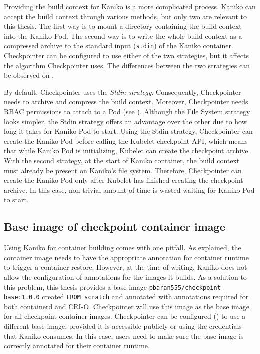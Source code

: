 \documentclass[
  digital,     %
  oneside,     %
  nosansbold,  %
  nocolorbold, %
  lof,         %
  nolot,         %
]{fithesis4}
\begin{document}
Providing the build context for Kaniko is a more complicated process. Kaniko can accept the build context through various methods, but only two are relevant to this thesis. The first way is to mount a directory containing the build context into the Kaniko Pod. The second way is to write the whole build context as a compressed archive to the standard input (\texttt{stdin}) of the Kaniko container. Checkpointer can be configured to use either of the two strategies, but it affects the algorithm Checkpointer uses. The differences between the two strategies can be observed on .


By default, Checkpointer uses the \emph{Stdin strategy}. Consequently, Checkpointer needs to archive and compress the build context. Moreover, Checkpointer needs RBAC permissions to attach to a Pod (see ). Although the File System strategy looks simpler, the Stdin strategy offers an advantage over the other due to how long it takes for Kaniko Pod to start. Using the Stdin strategy, Checkpointer can create the Kaniko Pod before calling the Kubelet checkpoint API, which means that while Kaniko Pod is initializing, Kubelet can create the checkpoint archive. With the second strategy, at the start of Kaniko container, the build context must already be present on Kaniko's file system. Therefore, Checkpointer can create the Kaniko Pod only after Kubelet has finished creating the checkpoint archive. In this case, non-trivial amount of time is wasted waiting for Kaniko Pod to start.

\subsection{Base image of checkpoint container image}
\label{sec:base-image}
Using Kaniko for container building comes with one pitfall. As  explained, the container image needs to have the appropriate annotation for container runtime to trigger a container restore. However, at the time of writing, Kaniko does not allow the configuration of annotations for the images it builds. As a solution to this problem, this thesis provides a base image \texttt{pbaran555/checkpoint-base:1.0.0} created \texttt{FROM scratch} and annotated with annotations required for both containerd and CRI-O. Checkpointer will use this image as the base image for all checkpoint container images. Checkpointer can be configured () to use a different base image, provided it is accessible publicly or using the credentials that Kaniko consumes. In this case, users need to make sure the base image is correctly annotated for their container runtime.
\end{document}
